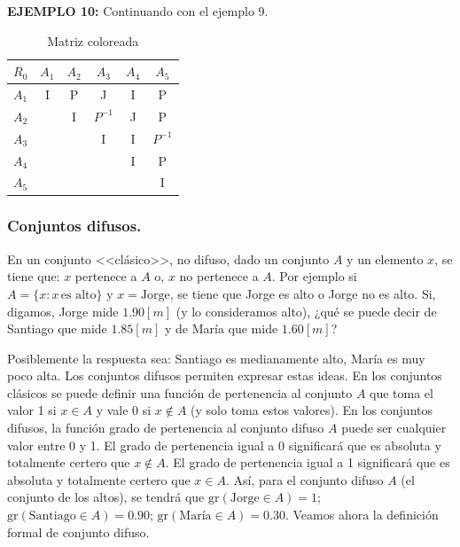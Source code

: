\documentclass[a5paper,doc,10pt,noapacite]{apa6}
\begin{document}
{{\vspace{1\baselineskip}
\textbf{EJEMPLO 10:} Continuando con el ejemplo 9.

\begin{table}[H]
   \fontsize{7}{11}\selectfont
   	\captionsetup{justification=centering, labelfont=footnotesize, font=footnotesize}
    \centering
	\begin{tabular}{c|ccccc} \thickline
	\(R_0\) & \(A_1\) & \(A_2\) & \(A_3\) & \(A_4\) & \(A_5\)  \\ \hline
    \(A_1\) & \cellcolor{pastelyellow} I & \cellcolor{paleblue} P & \cellcolor{pastelgray}J & \cellcolor{pastelyellow} I & \cellcolor{paleblue} P  \\
    \(A_2\) &  & \cellcolor{pastelyellow} I & \cellcolor{palegreen} \(P^{-1}\) & \cellcolor{pastelgray}J & \cellcolor{paleblue} P  \\
	\(A_3\) &  &  & \cellcolor{pastelyellow} I & \cellcolor{pastelyellow} I & \cellcolor{palegreen} \(P^{-1} \)  \\
	\(A_4\) &  &  &  & \cellcolor{pastelyellow} I & \cellcolor{paleblue} P   \\
	\(A_5\) &  &  &  &  & \cellcolor{pastelyellow}I   \\
    \end{tabular}
    \caption*{Matriz coloreada}
\label{tab:B4} 
\end{table}

	\subsubsection{Conjuntos difusos.}

En un conjunto <<clásico>>, no difuso, dado un conjunto \(A\) y un elemento \(x\), se tiene que: \(x\) pertenece a \(A\) o, \(x\) no pertenece a \(A\). Por ejemplo si \(A = \{x : x \, \text{es alto}\}\) y \(x = \text{Jorge}\), se tiene que Jorge es alto o Jorge no es alto. Si, digamos, Jorge mide \(1.90 [m]\) (y lo consideramos alto), ¿qué se puede decir de Santiago que mide \(1.85 [m]\) y de María que mide \(1.60[m]\)?

Posiblemente la respuesta sea: Santiago es medianamente alto, María es muy poco alta. Los conjuntos difusos permiten expresar estas ideas. En los conjuntos clásicos se puede definir una función de pertenencia al conjunto \(A\) que toma el valor 1 si \(x \in A\) y vale 0 si \(x \not \in A\) (y solo toma estos valores). En los conjuntos difusos, la función grado de pertenencia al conjunto difuso \(A\) puede ser cualquier valor entre 0 y 1. El grado de pertenencia igual a 0 significará que es absoluta y totalmente certero que \(x \not \in A\). El grado de pertenencia igual a 1 significará que es absoluta y totalmente certero que \(x \in A\). Así, para el conjunto difuso \(A\) (el conjunto de los altos), se tendrá que \(\text{gr}(\text{Jorge} \in A) = 1\); \(\text{gr}(\text{Santiago} \in A) = 0.90\); \(\text{gr}(\text{María} \in A) = 0.30\). Veamos ahora la definición formal de conjunto difuso. 

}}
\end{document}
